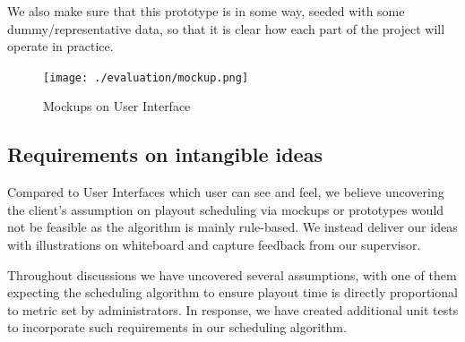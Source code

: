 \documentclass[a4paper]{article}
\begin{document}
We also make sure that this prototype is in some way, seeded with some
dummy/representative data, so that it is clear how each part of the project
will operate in practice.

\begin{figure}[H]
   \begin{center}
      \texttt{[image: ./evaluation/mockup.png]}
   \end{center}
   \caption{Mockups on User Interface}
   \label{fig:mockup}
\end{figure}

\subsection{Requirements on intangible ideas}
Compared to User Interfaces which user can see and feel, we believe 
uncovering the client's assumption on playout scheduling via mockups or 
prototypes would not be feasible as the algorithm is mainly rule-based.
We instead deliver our ideas with illustrations on whiteboard and
capture feedback from our supervisor.

Throughout discussions we have uncovered several assumptions, with one of them
expecting the scheduling algorithm to ensure playout time is 
directly proportional to metric set by administrators. In response,
we have created additional unit tests to incorporate such requirements 
in our scheduling algorithm.
\end{document}
